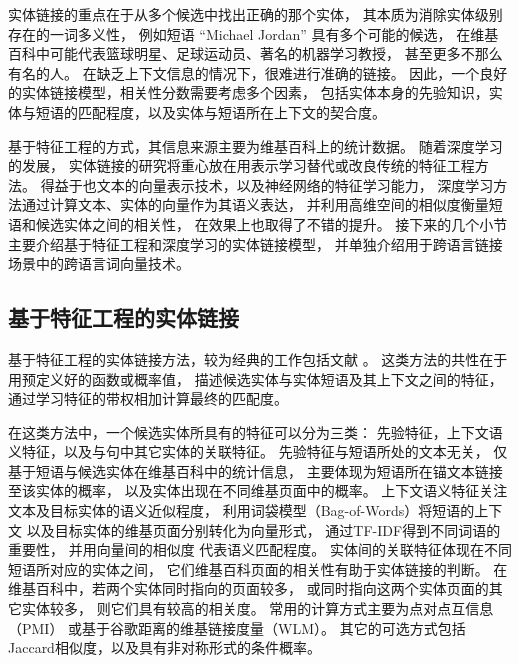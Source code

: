 
实体链接的重点在于从多个候选中找出正确的那个实体，
其本质为消除实体级别存在的一词多义性，
例如短语 ``Michael Jordan'' 具有多个可能的候选，
在维基百科中可能代表篮球明星、足球运动员、著名的机器学习教授，
甚至更多不那么有名的人。
在缺乏上下文信息的情况下，很难进行准确的链接。
因此，一个良好的实体链接模型，相关性分数需要考虑多个因素，
包括实体本身的先验知识，实体与短语的匹配程度，以及实体与短语所在上下文的契合度。

基于特征工程的方式，其信息来源主要为维基百科上的统计数据。
随着深度学习的发展，
实体链接的研究将重心放在用表示学习替代或改良传统的特征工程方法。
得益于也文本的向量表示技术，以及神经网络的特征学习能力，
深度学习方法通过计算文本、实体的向量作为其语义表达，
并利用高维空间的相似度衡量短语和候选实体之间的相关性，
在效果上也取得了不错的提升。
接下来的几个小节主要介绍基于特征工程和深度学习的实体链接模型，
并单独介绍用于跨语言链接场景中的跨语言词向量技术。


\subsection{基于特征工程的实体链接}
\label{sec:rw-linking-feature}

基于特征工程的实体链接方法，较为经典的工作包括文献
\parencite{hoffart2011robust,ratinov2011local,shen2012linden,yang2015s,luo2015joint}。
这类方法的共性在于用预定义好的函数或概率值，
描述候选实体与实体短语及其上下文之间的特征，
通过学习特征的带权相加计算最终的匹配度。


在这类方法中，一个候选实体所具有的特征可以分为三类：
先验特征，上下文语义特征，以及与句中其它实体的关联特征。
先验特征与短语所处的文本无关，
仅基于短语与候选实体在维基百科中的统计信息，
主要体现为短语所在锚文本链接至该实体的概率，
以及实体出现在不同维基页面中的概率。
上下文语义特征关注文本及目标实体的语义近似程度，
利用词袋模型（Bag-of-Words）将短语的上下文
以及目标实体的维基页面分别转化为向量形式，
通过TF-IDF得到不同词语的重要性，
并用向量间的相似度
代表语义匹配程度。
实体间的关联特征体现在不同短语所对应的实体之间，
它们维基百科页面的相关性有助于实体链接的判断。
在维基百科中，若两个实体同时指向的页面较多，
或同时指向这两个实体页面的其它实体较多，
则它们具有较高的相关度。
常用的计算方式主要为点对点互信息（PMI）\cite{ratinov2011local}
或基于谷歌距离的维基链接度量（WLM）\cite{shen2012linden}。
其它的可选方式包括Jaccard相似度，以及具有非对称形式的条件概率。

